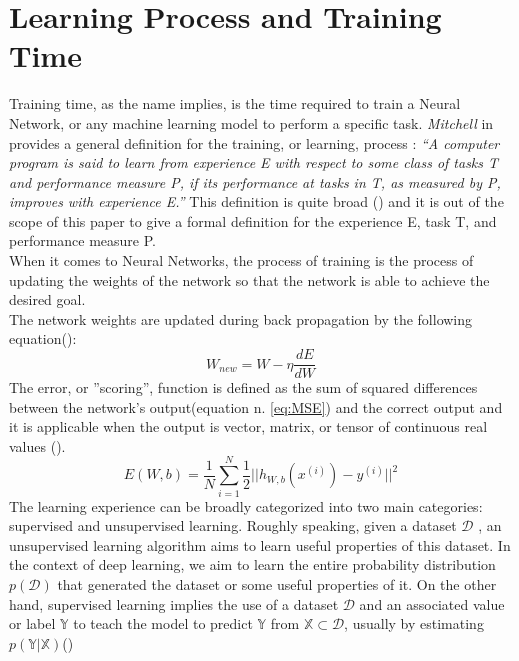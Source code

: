 \section{Learning Process and Training Time}\label{sec:training_time}
Training time, as the name implies, is the time required to train a Neural Network, or any machine learning model to perform a specific task. \textit{Mitchell} in \cite{machine_learning} provides a general definition for the training, or learning, process : \textit{“A computer program is said to learn from experience E with respect to some class of tasks T and performance measure P, if its performance at tasks in T, as measured by P, improves with experience E.”} This definition is quite broad (\cite{Goodfellow-et-al-2016}) and it is out of the scope of this paper to give a formal definition for the experience E, task T, and performance measure P.\\When it comes to Neural Networks, the process of training is the process of updating the weights of the network so that the network is able to achieve the desired goal. \cite{murphy2016overview} \\
The network weights are updated during back propagation by the following equation(\cite{murphy2016overview}):
\begin{equation}
W_{new} = W - \eta \frac{dE}{dW}
\end{equation}
The error, or ''scoring'', function is defined as the sum of squared differences between the network's output(equation n. \ref{eq:MSE}) and the correct output and it is applicable when the output is vector, matrix, or tensor of continuous real values (\cite{murphy2016overview}). 
\begin{equation}
E(W,b) = \frac{1}{N} \sum_{i=1}^{N} \frac{1}{2} \vert \vert h_{W,b} (x^{(i)}) - y^{(i)} \vert \vert ^{2}
\label{eq:MSE}
\end{equation}
The learning experience can be broadly categorized into two main categories: supervised and unsupervised learning. Roughly speaking, given a dataset $\mathcal{D}$ , an unsupervised learning algorithm aims to learn useful properties of this dataset. In the context of deep learning, we aim to learn the entire probability distribution $p(\mathcal{D})$ that generated the dataset or some useful properties of it. On the other hand, supervised learning implies the use of a dataset $\mathcal{D}$ and an associated value or label $\mathbb{Y}$ to teach the model to predict $\mathbb{Y}$ from $\mathbb{X} \subset \mathcal{D}$, usually by estimating $p(\mathbb{Y} \vert \mathbb{X})$(\cite{murphy2016overview})\\
